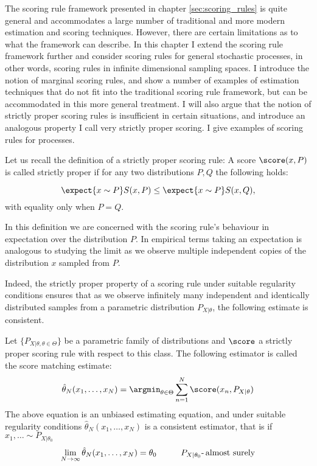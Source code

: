 The scoring rule framework presented in chapter \ref{sec:scoring_rules} is quite general and accommodates a large number of traditional and more modern estimation and scoring techniques. However, there are certain limitations as to what the framework can describe. In this chapter I extend the scoring rule framework further and consider scoring rules for general stochastic processes, in other words, scoring rules in infinite dimensional sampling spaces. I introduce the notion of marginal scoring rules, and show a number of examples of estimation techniques that do not fit into the traditional scoring rule framework, but can be accommodated in this more general treatment. I will also argue that the notion of strictly proper scoring rules is insufficient in certain situations, and introduce an analogous property I call very strictly proper scoring. I give examples of scoring rules for processes.


Let us recall the definition of a strictly proper scoring rule: A score $\score(x,P)$ is called strictly proper if for any two distributions $P,Q$ the following holds:

\begin{equation}
	\expect{x\sim P}S(x,P) \leq \expect{x\sim P}S(x,Q),
\end{equation}
with equality only when $P=Q$.

In this definition we are concerned with the scoring rule's behaviour in expectation over the distribution $P$. In empirical terms taking an expectation is analogous to studying the limit as we observe multiple independent copies of the distribution $x$ sampled from $P$.

Indeed, the strictly proper property of a scoring rule under suitable regularity conditions ensures that as we observe infinitely many independent and identically distributed samples from a parametric distribution $P_{X\vert\theta}$, the following estimate is consistent.

\begin{definition}
Let $\{P_{X\vert\theta, \theta\in\Theta}\}$ be a parametric family of distributions and $\score$ a strictly proper scoring rule with respect to this class. The following estimator is called the score matching estimate:
\begin{equation}
	\hat{\theta}_N(x_1,\ldots,x_N) = \argmin_{\theta\in\Theta} \sum_{n=1}^{N}\score(x_n,P_{X\vert\theta}) \label{eqn:score_matching}
\end{equation}
The above equation is an unbiased estimating equation, and under suitable regularity conditions $\hat{\theta}_N(x_1,\ldots,x_N)$ is a consistent estimator, that is if $x_1,\ldots\sim P_{X\vert\theta_0}$\iid
\begin{equation}
	\lim_{N \rightarrow \infty} \hat{\theta}_N(x_1,\ldots,x_N) = \theta_0\hspace{1cm} P_{X\vert\theta_0}\mbox{-\,almost surely}
\end{equation}
\end{definition}

